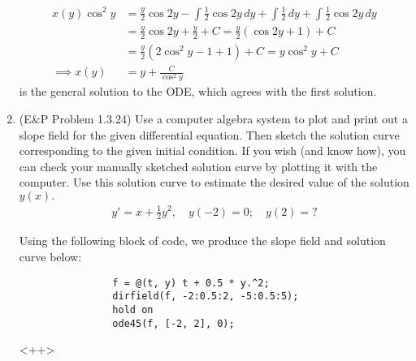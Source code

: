 \documentclass{article}
\begin{document}
\begin{enumerate}
\begin{soln}
			\begin{align*}
				x(y)\cos^2 y &= \frac{y}{2}\cos 2y - \int \frac{1}{2}\cos 2y\, dy + \int\frac{1}{2}\, dy + \int\frac{1}{2}\cos 2y\, dy \\
				&= \frac{y}{2}\cos 2y + \frac{y}{2}  + C = \frac{y}{2}\left( \cos 2y + 1 \right) + C \\
				&= \frac{y}{2}\left( 2\cos^2y-1+1 \right) + C = y\cos^2y + C \\
				\implies x(y) &= \boxed{y + \frac{C}{\cos^2 y}}
			\end{align*}
			is the general solution to the ODE, which agrees with the first solution.

		\end{soln}

	\item (E\&P Problem 1.3.24) Use a computer algebra system to plot and print out a slope field for the given differential equation. Then sketch the solution curve corresponding to the given initial condition. If you wish (and know how), you can check your manually sketched solution curve by plotting it with the computer. Use this solution curve to estimate the desired value of the solution $y(x).$
		\begin{align*}
			y'=x+\frac{1}{2} y^2, \quad y(-2)=0; \quad y(2)=?
		\end{align*}
		\begin{soln}
			Using the following block of code, we produce the slope field and solution curve below:
			\begin{lstlisting}
				f = @(t, y) t + 0.5 * y.^2;
				dirfield(f, -2:0.5:2, -5:0.5:5);
				hold on
				ode45(f, [-2, 2], 0);
			\end{lstlisting}
			
		\end{soln}<++>


\end{enumerate}
\end{document}
